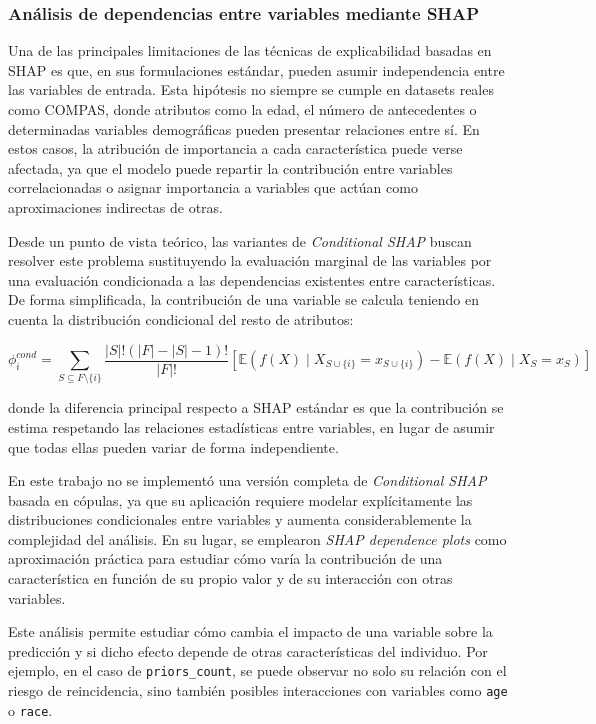 \documentclass[11pt,a4paper]{article}
\begin{document}
\subsubsection{Análisis de dependencias entre variables mediante SHAP}

Una de las principales limitaciones de las técnicas de explicabilidad basadas en SHAP es que, en sus formulaciones estándar, pueden asumir independencia entre las variables de entrada. Esta hipótesis no siempre se cumple en datasets reales como COMPAS, donde atributos como la edad, el número de antecedentes o determinadas variables demográficas pueden presentar relaciones entre sí. En estos casos, la atribución de importancia a cada característica puede verse afectada, ya que el modelo puede repartir la contribución entre variables correlacionadas o asignar importancia a variables que actúan como aproximaciones indirectas de otras.

Desde un punto de vista teórico, las variantes de \textit{Conditional SHAP} buscan resolver este problema sustituyendo la evaluación marginal de las variables por una evaluación condicionada a las dependencias existentes entre características. De forma simplificada, la contribución de una variable se calcula teniendo en cuenta la distribución condicional del resto de atributos:

\[
\phi_i^{cond} =
\sum_{S \subseteq F \setminus \{i\}}
\frac{|S|!(|F|-|S|-1)!}{|F|!}
\left[
\mathbb{E}(f(X) \mid X_{S \cup \{i\}} = x_{S \cup \{i\}})
-
\mathbb{E}(f(X) \mid X_S = x_S)
\right]
\]

donde la diferencia principal respecto a SHAP estándar es que la contribución se estima respetando las relaciones estadísticas entre variables, en lugar de asumir que todas ellas pueden variar de forma independiente.

En este trabajo no se implementó una versión completa de \textit{Conditional SHAP} basada en cópulas, ya que su aplicación requiere modelar explícitamente las distribuciones condicionales entre variables y aumenta considerablemente la complejidad del análisis. En su lugar, se emplearon \textit{SHAP dependence plots} como aproximación práctica para estudiar cómo varía la contribución de una característica en función de su propio valor y de su interacción con otras variables.

Este análisis permite estudiar cómo cambia el impacto de una variable sobre la predicción y si dicho efecto depende de otras características del individuo. Por ejemplo, en el caso de \texttt{priors\_count}, se puede observar no solo su relación con el riesgo de reincidencia, sino también posibles interacciones con variables como \texttt{age} o \texttt{race}.
\end{document}

